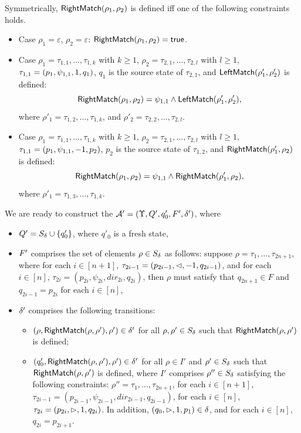 %
Symmetrically, $\mathsf{RightMatch}(\rho_1, \rho_2)$ is defined iff one of the following constraints holds.
\begin{itemize}
\item Case $\rho_1 = \varepsilon$, $\rho_2 = \varepsilon$: $\mathsf{RightMatch}(\rho_1, \rho_2) = \mathsf{true}$.

\item Case $\rho_1 =  \tau_{1,1}, \ldots, \tau_{1,k}$ with $k \ge 1$, $\rho_2 = \tau_{2,1}, \ldots, \tau_{2,l}$ with $l \ge 1$, $\tau_{1,1} = (p_1, \psi_{1,1}, 1, q_1)$, $q_1$ is the source state of $\tau_{2,1}$, and $\mathsf{LeftMatch}(\rho'_{1}, \rho'_2)$ is defined:  
$$\mathsf{RightMatch}(\rho_1, \rho_2) =\psi_{1,1} \wedge \mathsf{LeftMatch}(\rho'_{1}, \rho'_2),$$ 
where $\rho'_1 = \tau_{1, 2},\ldots, \tau_{1,k}$, and $\rho'_2 = \tau_{2,2}, \ldots, \tau_{2,l}$.
%
\item Case $\rho_1 =  \tau_{1,1}, \ldots, \tau_{1,k}$ with $k \ge 1$, $\rho_2 = \tau_{2,1}, \ldots, \tau_{2,l}$ with $l \ge 1$, $\tau_{1,1} = (p_1, \psi_{1,1}, -1, p_2)$, $p_2$ is the source state of $\tau_{1,2}$, and $\mathsf{RightMatch}(\rho'_1, \rho_2)$ is defined:  
$$\mathsf{RightMatch}(\rho_1, \rho_2) = \psi_{1,1} \wedge \mathsf{RightMatch}(\rho'_1, \rho_2),$$ 
where $\rho'_1 = \tau_{1,3}, \ldots, \tau_{1,k}$.
%
\end{itemize}
%
We are ready to construct the \SA{} $\mathcal{A}' =  (\Upsilon, Q', q'_0, F', \delta')$, where
\begin{itemize}
\item $Q' = S_{\delta} \cup \{q'_0\}$, where $q'_0$ is a fresh state,
%
\item $F'$ comprises the set of elements $\rho \in S_{\delta}$ as follows: suppose $\rho = \tau_1, \ldots, \tau_{2n+1}$, where for each $i \in [n+1]$, $\tau_{2i-1} = (p_{2i-1}, \vartriangleleft, -1, q_{2i-1})$, and for each $i \in [n]$, $\tau_{2i} = (p_{2i}, \psi_{2i}, dir_{2i}, q_{2i})$, then $\rho$ must satisfy that $q_{2n+1} \in F$ and $q_{2i-1} = p_{2i}$ for each $i \in [n]$,  
%
\item $\delta'$ comprises the following transitions: 
%
\begin{itemize}
%
\item $(\rho, \mathsf{RightMatch}(\rho, \rho'), \rho') \in \delta'$ for all $\rho, \rho' \in S_{\delta}$ such that $\mathsf{RightMatch}(\rho, \rho')$ is defined;
%
\item  
%
$(q'_0, \mathsf{RightMatch}(\rho, \rho'), \rho') \in \delta'$ for all $\rho \in I'$ and $\rho' \in S_{\delta}$ such that $\mathsf{RightMatch}(\rho, \rho')$ is defined, where 
$I'$ comprises $\rho'' \in S_{\delta}$ satisfying the following constraints: $\rho'' = \tau_1, \ldots, \tau_{2n+1}$,  for each $i \in [n+1]$, $\tau_{2i-1} = (p_{2i-1}, \psi_{2i-1}, dir_{2i-1}, q_{2i-1})$, for each $i \in [n]$, $\tau_{2i} = (p_{2i}, \vartriangleright, 1, q_{2i})$. In addition, $(q_0, \vartriangleright, 1, p_1) \in \delta$, and for each $i \in [n]$, $q_{2i} = p_{2i+1}$. 
\end{itemize}
%
\end{itemize}

